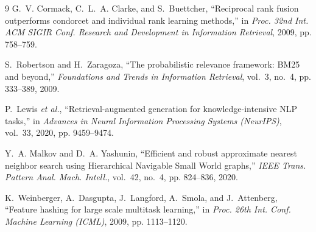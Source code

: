 \documentclass[conference]{IEEEtran}
\begin{document}
\begin{thebibliography}{9}
G.~V. Cormack, C.~L.~A. Clarke, and S.~Buettcher, ``Reciprocal rank fusion outperforms condorcet and individual rank learning methods,'' in \emph{Proc. 32nd Int. ACM SIGIR Conf. Research and Development in Information Retrieval}, 2009, pp. 758--759.

S.~Robertson and H.~Zaragoza, ``The probabilistic relevance framework: BM25 and beyond,'' \emph{Foundations and Trends in Information Retrieval}, vol.~3, no.~4, pp. 333--389, 2009.

P.~Lewis \emph{et al.}, ``Retrieval-augmented generation for knowledge-intensive NLP tasks,'' in \emph{Advances in Neural Information Processing Systems (NeurIPS)}, vol.~33, 2020, pp. 9459--9474.

Y.~A. Malkov and D.~A. Yashunin, ``Efficient and robust approximate nearest neighbor search using Hierarchical Navigable Small World graphs,'' \emph{IEEE Trans. Pattern Anal. Mach. Intell.}, vol.~42, no.~4, pp. 824--836, 2020.

K.~Weinberger, A.~Dasgupta, J.~Langford, A.~Smola, and J.~Attenberg, ``Feature hashing for large scale multitask learning,'' in \emph{Proc. 26th Int. Conf. Machine Learning (ICML)}, 2009, pp. 1113--1120.
\end{thebibliography}
\end{document}
